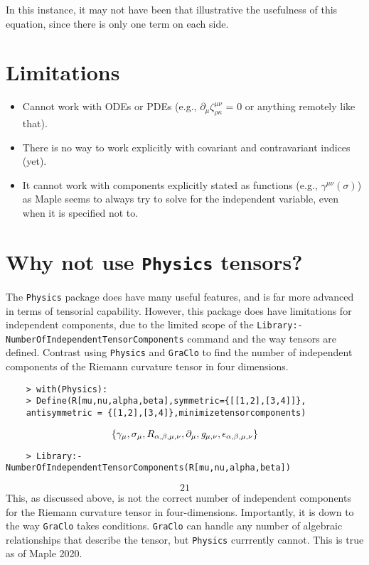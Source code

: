 \documentclass{article}
\begin{document}
In this instance, it may not have been that illustrative the usefulness of this equation, since there is only one term on each side.

\section*{Limitations}

\begin{itemize}
    \item Cannot work with ODEs or PDEs (e.g., $\partial_\mu \zeta^{\mu\nu}_{\rho\kappa}$ = 0 or anything remotely like that).
    \item There is no way to work explicitly with covariant and contravariant indices (yet).
    \item It cannot work with components explicitly stated as functions (e.g., $\gamma^{\mu\nu}(\sigma)$) as Maple seems to always try to solve for the independent variable, even when it is specified not to.
\end{itemize}

\section*{Why not use \verb~Physics~ tensors?}
The \verb~Physics~ package does have many useful features, and is far more advanced in terms of tensorial capability. However, this package does have limitations for independent components, due to the limited scope of the \verb~Library:-NumberOfIndependentTensorComponents~ command and the way tensors are defined. Contrast using \verb~Physics~ and \verb~GraClo~ to find the number of independent components of the Riemann curvature tensor in four dimensions.

\begin{verbatim}
    > with(Physics):
    > Define(R[mu,nu,alpha,beta],symmetric={[[1,2],[3,4]]}, 
    antisymmetric = {[1,2],[3,4]},minimizetensorcomponents)
\end{verbatim}
\begin{equation*}
    \left\{ {\it \gamma}_{{\mu}},{\it \sigma}_{{\mu}},R_{{\alpha,\beta,
\mu,\nu}},{\it \partial}_{{\mu}},{\it g}_{{\mu,\nu}},{\it \epsilon}_{{
\alpha,\beta,\mu,\nu}} \right\} 
\end{equation*}
\begin{verbatim}
    > Library:-NumberOfIndependentTensorComponents(R[mu,nu,alpha,beta])
\end{verbatim}
\begin{equation*}
    21
\end{equation*}
This, as discussed above, is not the correct number of independent components for the Riemann curvature tensor in four-dimensions. Importantly, it is down to the way \verb~GraClo~ takes conditions. \verb~GraClo~ can handle any number of algebraic relationships that describe the tensor, but \verb~Physics~ currrently cannot. This is true as of Maple 2020.
\end{document}
